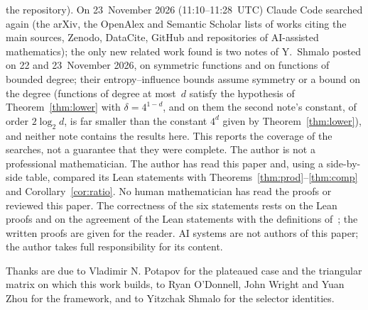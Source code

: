 \documentclass[11pt]{article}
\theoremstyle{definition}
\theoremstyle{remark}
\renewcommand{\lg}{\log_2}
\begin{document}
the repository). On 23~November 2026 (11:10--11:28~UTC) Claude Code searched again (the arXiv, the OpenAlex and Semantic Scholar lists of works citing the main sources, Zenodo, DataCite, GitHub and repositories of AI-assisted mathematics); the only new related work found is two notes of Y.~Shmalo posted on 22 and 23~November 2026, on symmetric functions and on functions of bounded degree; their entropy--influence bounds assume symmetry or a bound on the degree (functions of degree at most~$d$ satisfy the hypothesis of Theorem~\ref{thm:lower} with $\delta=4^{1-d}$, and on them the second note's constant, of order $2\lg d$, is far smaller than the constant $4^d$ given by Theorem~\ref{thm:lower}), and neither note contains the results here. This reports the coverage of the searches,
not a guarantee that they were complete. The author is not a professional
mathematician. The author has read this paper and, using a side-by-side table, compared its Lean statements with Theorems~\ref{thm:prod}--\ref{thm:comp} and Corollary~\ref{cor:ratio}. No human mathematician has read the proofs or
reviewed this paper. The correctness of the six statements rests on the Lean
proofs and on the agreement of the Lean statements with the definitions
of~\cite{owz}; the written proofs are given for the reader. AI systems are not
authors of this paper; the author takes full responsibility for its content.

\medskip
\noindent Thanks are due to Vladimir N. Potapov for the plateaued case and the
triangular matrix on which this work builds, to Ryan O'Donnell, John Wright and
Yuan Zhou for the framework, and to Yitzchak Shmalo for the selector identities.
\end{document}
